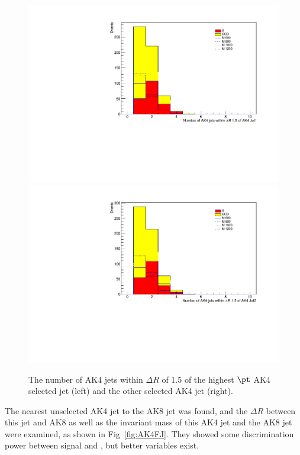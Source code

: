 \begin{figure}[thb!]
\begin{center}
\includegraphics[scale=0.34]{Figures/extraplSRnumnAKAK1.pdf}
\includegraphics[scale=0.34]{Figures/extraplSRnumnAKAK2.pdf}
\end{center}
\caption{The number of AK4 jets within $\Delta R$ of 1.5 of the highest $\pt$ AK4 selected jet (left) and the other selected AK4 jet (right).}
\label{fig:nAK4sAK4}
\end{figure} 

The nearest unselected AK4 jet to the AK8 jet was found, and the $\Delta R$ between this jet and AK8 as well as the invariant mass of this AK4 jet and the AK8 jet were examined, as shown in Fig~\ref{fig:AK4FJ}. They showed some discrimination power between signal and \ttbar, but better variables exist.

